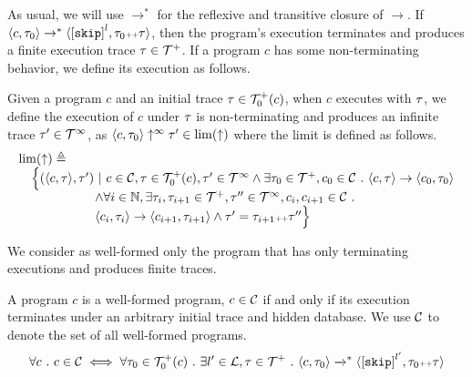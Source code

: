 As usual, we will use $\to^*$ for the reflexive and transitive closure of $\to$. 
 If $\config{c, \trace_0} \rightarrow^{*} \config{\clabel{\eskip}^l, \trace_0 \tracecat \trace}$,
 then the program's execution terminates and produces a finite execution trace $\mathtt{\tau} \in \mathcal{T}^{+}$. 
If a program $c$ has some non-terminating behavior, we define its execution as follows.
\\
\begin{defn}
 \label{def:adaptfun-non-terminating}
 Given a program $c$ and an initial trace $\mathtt{\tau} \in \mathcal{T}^{+}_0(c)$,
 when $c$ executes with $\mathtt{\tau}$, we define the execution of $c$ under $\mathtt{\tau}$ is non-terminating and produces an infinite trace $\mathtt{\tau}' \in \mathcal{T}^{\infty}$, as 
 $\langle c, \mathtt{\tau}_0 \rangle \uparrow^{\infty} \mathtt{\tau}' \in \lim(\uparrow)$
 where the limit is defined as follows.
 \[
 \begin{array}{l}
 \lim(\uparrow) 
 \triangleq 
 \\ \quad
 \Big\{
 (\langle c, \mathtt{\tau} \rangle, \mathtt{\tau}') ~\vert~ 
 c\in \mathcal{C}, \mathtt{\tau} \in \mathcal{T}^{+}_0(c),
 \mathtt{\tau}' \in \mathcal{T}^{\infty}
 \land \exists \mathtt{\tau}_0 \in \mathcal{T}^{+}, c_0 \in \mathcal{C} ~.~ 
 \langle c, \mathtt{\tau} \rangle \to \langle c_0, \mathtt{\tau}_0 \rangle
 \\ \qquad \qquad \qquad 
 \land \forall i \in \mathbb{N}, \exists \mathtt{\tau}_i, \mathtt{\tau}_{i + 1} \in \mathcal{T}^{+}, \mathtt{\tau}'' \in \mathcal{T}^{\infty}, c_i, c_{i + 1} \in \mathcal{C} ~.~ 
 \\ \qquad \qquad \qquad 
 \langle c_i, \mathtt{\tau}_i \rangle \to \langle c_{i + 1}, \mathtt{\tau}_{i + 1} \rangle 
 \land \mathtt{\tau}' = \mathtt{\tau}_{i + 1} {\scriptscriptstyle ++} \mathtt{\tau}''
 \Big\}
 \end{array}
 \]
\end{defn}
We consider as well-formed only the program that has only terminating executions and produces finite traces. 
\begin{defn}
 \label{def:adaptfun-wfprog} 
 A program $c$ is a well-formed program, $c \in \mathcal{C}$ if and only if
 its execution terminates
 under an arbitrary initial trace and hidden database. We use $\mathcal{C}$ to denote the set of all well-formed programs.
 \[
 \forall c \sthat c \in \cdom \iff 
 \forall \trace_0 \in \ftdom_0(c) \sthat \exists l' \in \ldom, \trace \in \ftdom
 \sthat \config{c, \trace_0} \xrightarrow{}^* \config{\clabel{\eskip}^{l'}, \trace_0 \tracecat \trace}
 \]
\end{defn}
